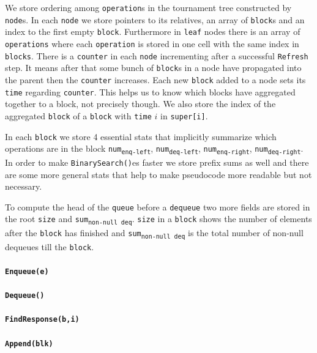 \documentclass[10pt]{article}
\renewcommand{\tt}[1]{\texttt{#1}}
\theoremstyle{definition}
\begin{document}
We store ordering among \texttt{operation}s in the tournament tree constructed by \texttt{node}s. In each \texttt{node} we store pointers to its relatives, an array of \texttt{block}s and an index to the first empty \texttt{block}. Furthermore in \texttt{leaf} nodes there is an array of \texttt{operations} where each \texttt{operation} is stored in one cell with the same index in \texttt{blocks}. There is a \texttt{counter} in each \texttt{node} incrementing after a successful \texttt{Refresh} step. It means after that some bunch of \texttt{block}s in a node have propagated into the parent then the \texttt{counter} increases. Each new \texttt{block} added to a node sets its \texttt{time} regarding \texttt{counter}. This helps us to know which blocks have aggregated together to a block, not precisely though. We also store the index of the aggregated \texttt{block} of a \texttt{block} with \texttt{time} $i$ in \texttt{super[i]}. 

In each \texttt{block} we store 4 essential stats that implicitly summarize which operations are in the block \texttt{num\textsubscript{enq-left}}, \texttt{num\textsubscript{deq-left}}, \texttt{num\textsubscript{enq-right}}, \texttt{num\textsubscript{deq-right}}. In order to make \texttt{BinarySearch()}es faster we store prefix sums as well and there are some more general stats that help to make pseudocode more readable but not necessary.

To compute the head of the \texttt{queue} before a \texttt{dequeue} two more fields are stored in the root \texttt{size} and \texttt{sum\textsubscript{non-null deq}}. \texttt{size} in a \texttt{block} shows the number of elements after the \texttt{block} has finished and \texttt{sum\textsubscript{non-null deq}} is the total number of non-null dequeues till the \texttt{block}.

\paragraph{\texttt{Enqueue(e)}}
\paragraph{\texttt{Dequeue()}}
\paragraph{\texttt{FindResponse(b,i)}}
\paragraph{\tt{Append(blk)}}
\end{document}
